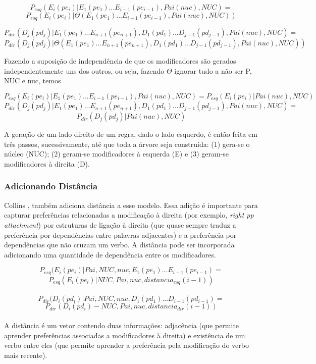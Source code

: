 $$P_{esq}(E_i(pe_i)|E_1(pe_1)...E_{i-1}(pe_{i-1}), Pai(nuc),NUC) = $$
$$P_{esq}(E_i(pe_i)|\Theta(E_1(pe_1)...E_{i-1}(pe_{i-1}), Pai(nuc),NUC))$$

$$P_{dir}(D_j(pd_j)|E_1(pe_1)...E_{n+1}(pe_{n+1}),D_1(pd_1)...D_{j-1}(pd_{j-1}), Pai(nuc),NUC) = $$
$$P_{dir}(D_j(pd_j)|\Theta(E_1(pe_1)...E_{n+1}(pe_{n+1}),D_1(pd_1)...D_{j-1}(pd_{j-1}), Pai(nuc),NUC))$$



Fazendo a suposição de independência de que os modificadores são gerados independentemente uns dos outros, ou seja, fazendo $\Theta$ ignorar tudo a não ser P, NUC e nuc, temos


$$P_{esq}(E_i(pe_i)|E_1(pe_1)...E_{i-1}(pe_{i-1}), Pai(nuc),NUC) = P_{esq}(E_i(pe_i)|Pai(nuc),NUC)$$
$$P_{dir}(D_j(pd_j)|E_1(pe_1)...E_{n+1}(pe_{n+1}),D_1(pd_1)...D_{j-1}(pd_{j-1}), Pai(nuc),NUC) =$$
$$P_{dir}(D_j(pd_j)|Pai(nuc),NUC)$$


A geração de um lado direito de um regra, dado o lado esquerdo, é então feita em
três passos, sucessivamente, até que toda a árvore seja construída: (1) gera-se o núcleo (NUC); (2) geram-se modificadores à esquerda (E) e (3) geram-se modificadores à direita (D).


\subsubsection{Adicionando Distância}
\label{sub:distancia}

Collins \cite{collins97}, também adiciona distância a esse modelo. Essa adição é importante para capturar preferências relacionadas a modificação à direita (por exemplo, \emph{right pp attachment}) por estruturas de ligação à direita (que quase sempre traduz a preferência por dependências entre palavras adjacentes) e a preferência por dependências que não cruzam um verbo. A distância pode ser incorporada adicionando uma quantidade de dependência entre os modificadores.

$$P_{esq}(E_i(pe_i)|Pai,NUC, nuc,E_1(pe_1)...E_{i-1}(pe_{i - 1}) = $$
$$P_{esq}(E_i(pe_i)|NUC, Pai, nuc, distancia_{esq}(i - 1))$$
\\
$$P_{dir}(D_i(pd_i)|Pai,NUC, nuc,D_1(pd_1)...D_{i-1}(pd_{i - 1}) = $$
$$P_{dir}(D_i(pd_i)-NUC, Pai, nuc, distancia_{dir}(i - 1))$$
\\

A distância é um vetor contendo duas informações: adjacência (que permite aprender preferências associadas a modificadores à direita) e existência de um verbo entre eles (que permite aprender a preferência pela modificação do verbo mais recente).

